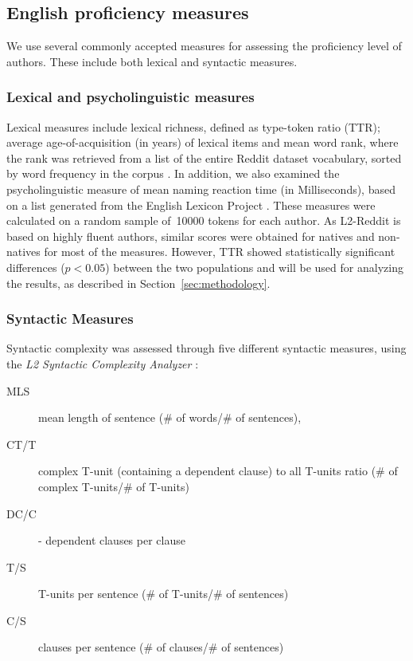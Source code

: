 \documentclass[11pt]{article}
\begin{document}
\subsection{English proficiency measures}

We use several commonly accepted measures for assessing the proficiency level of authors. These include both lexical and syntactic measures.

\subsubsection{Lexical and psycholinguistic measures}

Lexical measures include lexical richness, defined as type-token ratio (TTR); average age-of-acquisition (in years) of lexical items \citep{Kuperman2012} and mean word rank, where the rank was retrieved from a list of the entire Reddit dataset vocabulary, sorted by word frequency in the corpus \citep{TACL1403}.  In addition, we also examined the psycholinguistic measure of mean naming reaction time (in Milliseconds), based on a list generated from the English Lexicon Project \citep{Balota2007}. These measures were calculated on a random sample of~10000 tokens for each author. As L2-Reddit is based on highly fluent authors, similar scores were obtained for natives and non-natives for most of the measures. However, TTR showed statistically significant differences ($p<0.05$) between the two populations and will be used for analyzing the results, as described in Section~\ref{sec:methodology}.


\subsubsection{Syntactic Measures }

Syntactic complexity was assessed through five different syntactic measures, using the \emph{L2 Syntactic Complexity Analyzer} \citep{Lu2010-Automatic}:

\begin{description}
\item[MLS] mean length of sentence (\# of words/\# of sentences), 
\item[CT/T] complex T-unit (containing a dependent clause) to all T-units ratio (\# of complex T-units/\# of T-units)
\item [DC/C] - dependent clauses per clause
\item[T/S] T-units per sentence (\# of T-units/\# of sentences)
\item[C/S] clauses per sentence (\# of clauses/\# of sentences)
\end{description}
\end{document}

